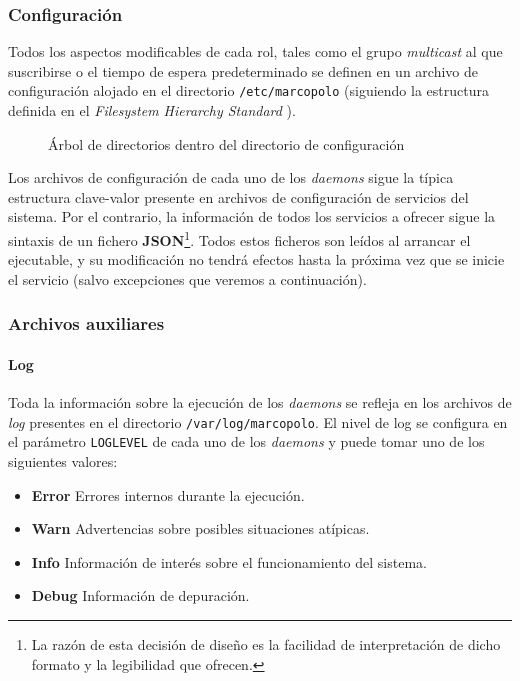 \subsubsection{Configuración}

Todos los aspectos modificables de cada rol, tales como el grupo \textit{multicast} al que suscribirse o el tiempo de espera predeterminado se definen en un archivo de configuración alojado en el directorio \texttt{/etc/marcopolo} (siguiendo la estructura definida en el \textit{Filesystem Hierarchy Standard} \cite{fhs}).

\begin{figure}[H]
	\centering
	\caption{Árbol de directorios dentro del directorio de configuración}
	\label{fig:arbol_marcopoloconf}
\end{figure}

Los archivos de configuración de cada uno de los \textit{daemons} sigue la típica estructura clave-valor presente en archivos de configuración de servicios del sistema. Por el contrario, la información de todos los servicios a ofrecer sigue la sintaxis de un fichero \textbf{JSON}\footnote{La razón de esta decisión de diseño es la facilidad de interpretación de dicho formato y la legibilidad que ofrecen.}. Todos estos ficheros son leídos al arrancar el ejecutable, y su modificación no tendrá efectos hasta la próxima vez que se inicie el servicio (salvo excepciones que veremos a continuación).


\subsubsection{Archivos auxiliares}

\paragraph{Log}
Toda la información sobre la ejecución de los \textit{daemons} se refleja en los archivos de \textit{log} presentes en el directorio \texttt{/var/log/marcopolo}. El nivel de log se configura en el parámetro \texttt{LOGLEVEL} de cada uno de los \textit{daemons} y puede tomar uno de los siguientes valores:

\begin{itemize}
\item \textbf{Error} Errores internos durante la ejecución.
\item \textbf{Warn} Advertencias sobre posibles situaciones atípicas.
\item \textbf{Info} Información de interés sobre el funcionamiento del sistema.
\item \textbf{Debug} Información de depuración.
\end{itemize}


